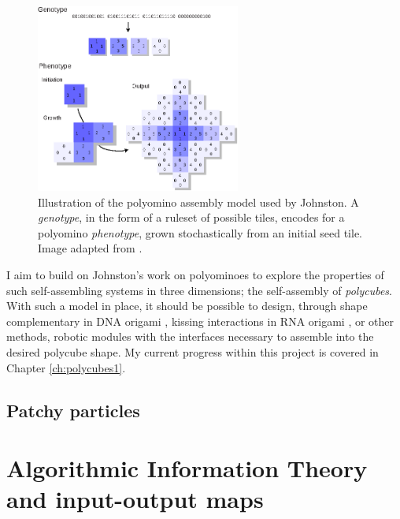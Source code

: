\begin{figure}[h]
    \centering\includegraphics[width=0.6\textwidth]{figures/polyominoes.eps}
    \caption{Illustration of the polyomino assembly model used by Johnston. A \emph{genotype}, in the form of a ruleset of possible tiles, encodes for a polyomino \emph{phenotype}, grown stochastically from an initial seed tile. Image adapted from \cite{johnston2011evolutionary}.}
    \label{fig:polyominoes}
\end{figure}

I aim to build on Johnston's work on polyominoes to explore the properties of such self-assembling systems in three dimensions; the self-assembly of \emph{polycubes}. With such a model in place, it should be possible to design, through shape complementary in DNA origami \cite{wagenbauer2017gigadalton}, kissing interactions in RNA origami \cite{geary2014single}, or other methods, robotic modules with the interfaces necessary to assemble into the desired polycube shape. My current progress within this project is covered in Chapter \ref{ch:polycubes1}.

\subsection{Patchy particles}

\section{Algorithmic Information Theory and input-output maps}



